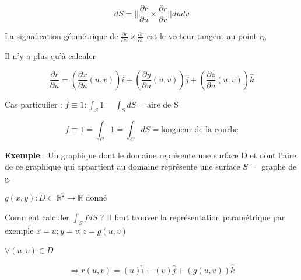 \[dS = ||\frac{\partial r }{\partial u } \times \frac{\partial r }{\partial v } || du dv\]

La signafication géométrique de $ \frac{\partial r }{\partial u } \times \frac{\partial r }{\partial v }$ est le vecteur tangent au point $r_0$

Il n'y a plus qu'à calculer

\[\frac{\partial r }{\partial u} =
\left( \frac{\partial x}{\partial u}(u,v)\right)\hat i +
\left( \frac{\partial y}{\partial u}(u,v)\right)\hat j +
\left(\frac{\partial z}{\partial u}(u,v)\right)\hat k
\]



Cas particulier : $f\equiv 1 : \int_S 1 = \int_S dS = \text{aire de S}$

\[f \equiv 1 = \int_C 1 = \int_C dS = \text{longueur de la courbe}\]


\textbf{Exemple }: Un graphique dont le domaine représente une surface D et dont l'aire de ce graphique qui appartient au domaine représente une surface $S=$ graphe de g.


 $g(x,y) : D\subset\mathbb{R}^2 \to \mathbb{R}$ donné


Comment calculer $\int_Sf dS$ ? Il faut trouver la représentation paramétrique par exemple
$x=u;y=v;z=g(u,v)$

$\forall (u,v) \in D $


\[\Rightarrow r (u,v) = (u)\hat i+(v)\hat j+(g(u,v))\hat k\]

